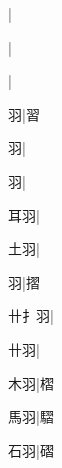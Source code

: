 \begin{multicols}{2}
{{}\mktsJzrVerticalBar{}{\cjk{}{\cnsym{}　}{\cnsym{}　}{\cnsym{}　}}|{}\par
{}|{}\par
{}|{}\par
{\cjk{}{\cnsym{}　}{\cnsym{}　}羽}\mktsJzrVerticalBar{}{\cjk{}{\cnsym{}　}{\cnsym{}　}{\cnsym{}　}}|{\cjk{}習}\par
{\cjk{}{\cnsym{}　}{\cnsym{}　}羽}\mktsJzrVerticalBar{}{\cjk{}{\cnsym{}　}{\cnsym{}　}{\cnsym{}　}}|{}\par
{羽}\mktsJzrVerticalBar{}{\cjk{}{\cnsym{}　}{\cnsym{}　}{\cnsym{}　}}|{}\par
{\cjk{}{\cnsym{}　}耳羽}\mktsJzrVerticalBar{}{\cjk{}{\cnsym{}　}{\cnsym{}　}{\cnsym{}　}}|{}\par
{\cjk{}{\cnsym{}　}土羽}\mktsJzrVerticalBar{}{\cjk{}{\cnsym{}　}{\cnsym{}　}{\cnsym{}　}}|{}\par
{羽}\mktsJzrVerticalBar{}{\cjk{}{\cnsym{}　}{\cnsym{}　}{\cnsym{}　}}|{\cjk{}摺}\par
{\cjk{}卄{扌}羽}\mktsJzrVerticalBar{}{\cjk{}{\cnsym{}　}{\cnsym{}　}{\cnsym{}　}}|{}\par
{\cjk{}{\cnsym{}　}卄羽}\mktsJzrVerticalBar{}{\cjk{}{\cnsym{}　}{\cnsym{}　}{\cnsym{}　}}|{}\par
{\cjk{}{\cnsym{}　}木羽}\mktsJzrVerticalBar{}{\cjk{}{\cnsym{}　}{\cnsym{}　}{\cnsym{}　}}|{\cjk{}槢}\par
{\cjk{}{\cnsym{}　}馬羽}\mktsJzrVerticalBar{}{\cjk{}{\cnsym{}　}{\cnsym{}　}{\cnsym{}　}}|{\cjk{}騽}\par
{\cjk{}{\cnsym{}　}石羽}\mktsJzrVerticalBar{}{\cjk{}{\cnsym{}　}{\cnsym{}　}{\cnsym{}　}}|{\cjk{}磖}\par
}
\end{multicols}
